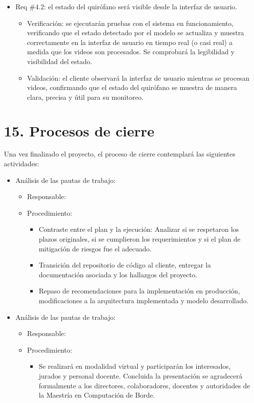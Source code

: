 \documentclass[
11pt, %
]{charter}
\begin{document}
\begin{itemize}
	\item Req \#4.2: el estado del quirófano será visible desde la interfaz de usuario.
	\begin{itemize}
		\item Verificación: se ejecutarán pruebas con el sistema en funcionamiento, verificando que el estado detectado por el modelo se actualiza y muestra correctamente en la interfaz de usuario en tiempo real (o casi real) a medida que los videos son procesados. Se comprobará la legibilidad y visibilidad del estado.
		\item Validación: el cliente observará la interfaz de usuario mientras se procesan videos, confirmando que el estado del quirófano se muestra de manera clara, precisa y útil para su monitoreo.
	\end{itemize}
	
\end{itemize}


\section{15. Procesos de cierre}    
\label{sec:cierre}

Una vez finalizado el proyecto, el proceso de cierre contemplará las siguientes actividades:
\begin{itemize}
	\item Análisis de las pautas de trabajo:
	\begin{itemize}
		\item[] Responsable: \authorname
		\item[] Procedimiento:
		\begin{itemize}
			\item Contraste entre el plan y la ejecución: Analizar si se respetaron los plazos originales, si se cumplieron los requerimientos y si el plan de mitigación de riesgos fue el adecuado.
			\item Transición del repositorio de código al cliente, entregar la documentación asociada y los hallazgos del proyecto.
			\item Repaso de recomendaciones para la implementación en producción, modificaciones a la arquitectura implementada y modelo desarrollado.
		\end{itemize}
	\end{itemize}
		\item Análisis de las pautas de trabajo:
	\begin{itemize}
		\item[] Responsable: \authorname
		\item[] Procedimiento:
		\begin{itemize}
			\item Se realizará en modalidad virtual y participarán los interesados, jurados y personal docente. Concluida la presentación se agradecerá formalmente a los directores, colaboradores, docentes y autoridades de la Maestría en Computación de Borde.

		\end{itemize}
		\end{itemize}
\end{itemize}
\end{document}
